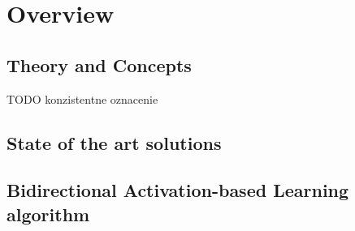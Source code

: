 



\section{Overview}

\subsection{Theory and Concepts}
TODO konzistentne oznacenie 

 

\subsection{State of the art solutions} 


%










\subsection{Bidirectional Activation-based Learning algorithm} 

 
